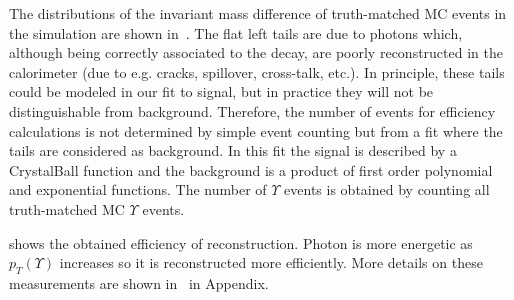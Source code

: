The distributions of the invariant mass difference of truth-matched MC events in the
\chib simulation are shown in~. The flat left tails 
are due to photons which, although being correctly associated to the \chib decay,
are poorly reconstructed in the calorimeter (due to e.g. cracks, spillover, cross-talk, 
etc.). In principle, these tails could be modeled in our fit to signal, but in
practice they will not be distinguishable from background. Therefore, the
number of \chib events for efficiency calculations is not determined by simple
event counting but from a fit where the tails are considered as background. In
this fit the signal is described by a CrystalBall function and the background is
a product of first order polynomial and exponential functions. The number of $\Upsilon$
events is obtained by counting all truth-matched MC $\Upsilon$ events.



 shows the obtained efficiency of \chib reconstruction.
Photon is more energetic as $p_T(\Upsilon)$ increases so it is reconstructed more
efficiently. More details on these measurements are shown
in~ in Appendix.


